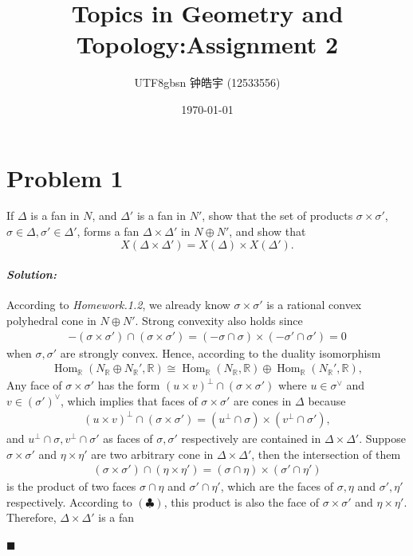 \documentclass[12pt, a4paper]{article}
\title{Topics in Geometry and Topology:Assignment 2}
\author{
    \begin{CJK*}{UTF8}{gbsn}
    钟皓宇 (12533556)
    \end{CJK*}
}
\date{\today}
\newenvironment{solution}
  {\paragraph{\textit{Solution:}}\par\medskip}
  {\hfill$\blacksquare$\vspace{0.1cm}}
\begin{document}
\maketitle

\section*{Problem 1}
If $\Delta$ is a fan in $N$, and $\Delta'$ is a fan in $N'$, show that the set of products $\sigma \times \sigma'$, $\sigma \in \Delta, \sigma' \in \Delta'$, forms a fan $\Delta \times \Delta'$ in $N \oplus N'$, and show that
\[
X(\Delta \times \Delta') = X(\Delta) \times X(\Delta').
\]
\begin{solution}
According to \textit{Homework.1.2}, we already know $\sigma \times \sigma'$ is a rational convex polyhedral cone in $N\oplus N'$. Strong convexity also holds since
\begin{align*}
    -(\sigma\times \sigma')\cap (\sigma\times \sigma')= (-\sigma\cap \sigma)\times (-\sigma'\cap \sigma')=0
\end{align*}
when $\sigma,\sigma'$ are strongly convex. Hence, according to the duality isomorphism
\begin{align*}
    \operatorname{Hom}_{\mathbb{R}}(N_\mathbb{R}\oplus N_\mathbb{R}',\mathbb{R}) \cong \operatorname{Hom}_{\mathbb{R}}(N_\mathbb{R},\mathbb{R}) \oplus \operatorname{Hom}_{\mathbb{R}}(N_\mathbb{R}',\mathbb{R}),
\end{align*}
Any face of $\sigma\times\sigma'$ has the form $(u\times v)^\perp\cap(\sigma\times \sigma')$ where $u\in \sigma^\vee$ and $v\in (\sigma')^\vee$, which implies that faces of $\sigma\times\sigma'$ are cones in $\Delta$
because 
\begin{align*}
    (u\times v)^\perp\cap(\sigma\times \sigma') = (u^{\perp}\cap \sigma) \times (v^{\perp}\cap \sigma'), \tag{$\clubsuit$}
\end{align*}
and $u^{\perp}\cap \sigma,v^{\perp}\cap \sigma'$ as faces of $\sigma,\sigma'$ respectively are contained in $\Delta\times\Delta'$. Suppose $\sigma\times \sigma'$ and 
$\eta\times\eta'$ are two arbitrary cone in $\Delta\times\Delta'$, then the intersection of them
\begin{align*}
    (\sigma\times\sigma')\cap(\eta\times\eta') = (\sigma\cap\eta)\times (\sigma'\cap\eta')
\end{align*}
is the product of two faces $\sigma\cap\eta$ and $\sigma'\cap\eta'$, which are the faces of $\sigma,\eta$ and $\sigma',\eta'$ respectively. 
According to $(\clubsuit)$, this product is also the face of $\sigma\times\sigma'$ and $\eta\times\eta'$. Therefore, $\Delta\times\Delta'$ is a fan

\end{solution}
\end{document}
